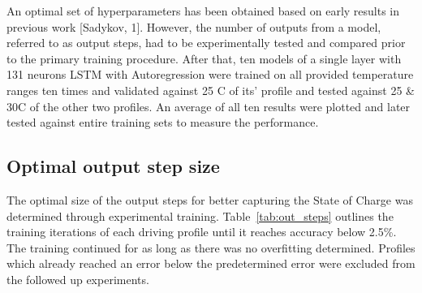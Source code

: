  {
    An optimal set of hyperparameters has been obtained based on early results in previous work [Sadykov, 1].
}
However, the number of outputs from a model, referred to as output steps, had to be experimentally tested and compared prior to the primary training procedure.
After that, ten models of a single layer with 131 neurons LSTM with Autoregression were trained on all provided temperature ranges ten times and validated against 25 \textdegree{}C of its' profile and tested against 25 \& 30\textdegree{}C of the other two profiles.
An average of all ten results were plotted and later tested against entire training sets to measure the performance.

\subsection{Optimal output step size}
    The optimal size of the output steps for better capturing the State of Charge was determined through experimental training.
    \mbox{Table~\ref{tab:out_steps}} outlines the training iterations of each driving profile until it reaches accuracy below 2.5\%.
    The training continued for as long as there was no overfitting determined.
    Profiles which already reached an error below the predetermined error were excluded from the followed up experiments.
    \begin{table}[htbp]
        \renewcommand{\arraystretch}{1.3}
        \caption{Percentage accuracy evaluation with increasing output step size}
        \centering
        \label{tab:out_steps}
    \end{table}
    
